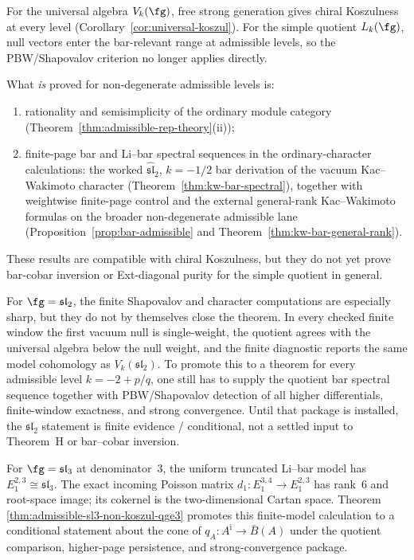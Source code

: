 \begin{remark}
\label{rem:admissible-koszul-status}
For the universal algebra $V_k(\fg)$, free strong generation
gives chiral Koszulness at every level
\textup{(}Corollary~\ref{cor:universal-koszul}\textup{)}.
For the simple quotient $L_k(\fg)$, null vectors enter the
bar-relevant range at admissible levels, so the PBW/Shapovalov
criterion no longer applies directly.

What \emph{is} proved for non-degenerate admissible levels is:
\begin{enumerate}[label=\textup{(\roman*)}]
\item rationality and semisimplicity of the ordinary module
 category \textup{(}Theorem~\ref{thm:admissible-rep-theory}(ii)\textup{)};
\item finite-page bar and Li--bar spectral sequences in the
 ordinary-character calculations: the worked
 $\widehat{\mathfrak{sl}}_2$, $k=-1/2$ bar derivation of the vacuum
 Kac--Wakimoto character \textup{(}Theorem~\ref{thm:kw-bar-spectral}\textup{)},
 together with weightwise finite-page control and the external
 general-rank Kac--Wakimoto formulas on the broader
 non-degenerate admissible lane
 \textup{(}Proposition~\ref{prop:bar-admissible} and
 Theorem~\ref{thm:kw-bar-general-rank}\textup{)}.
\end{enumerate}
These results are compatible with chiral Koszulness, but they do
not yet prove bar-cobar inversion or Ext-diagonal purity for the
simple quotient in general.

For $\fg = \mathfrak{sl}_2$, the finite Shapovalov and character
computations are especially sharp, but they do not by themselves close
the theorem.  In every checked finite window the first vacuum null is
single-weight, the quotient agrees with the universal algebra below
the null weight, and the finite diagnostic reports the same model
cohomology as $V_k(\mathfrak{sl}_2)$. To promote this to a theorem for
every admissible level $k = -2 + p/q$, one still has to supply the
quotient bar spectral sequence together with PBW/Shapovalov detection
of all higher differentials, finite-window exactness, and strong
convergence. Until that package is installed, the
$\mathfrak{sl}_2$ statement is finite evidence / conditional, not a
settled input to Theorem~H or bar--cobar inversion.

For $\fg=\mathfrak{sl}_3$ at denominator~$3$, the uniform truncated
Li--bar model has
$E_1^{2,3}\cong\mathfrak{sl}_3$.  The exact incoming Poisson matrix
$d_1\colon E_1^{3,4}\to E_1^{2,3}$ has rank~$6$ and root-space
image; its cokernel is the two-dimensional Cartan space.  Theorem
\ref{thm:admissible-sl3-non-koszul-qge3} promotes this finite-model
calculation to a conditional statement about the cone of
$q_A\colon A^{\mathrm i}\to\bar B(A)$ under the quotient comparison,
higher-page persistence, and strong-convergence package.


\end{remark}
